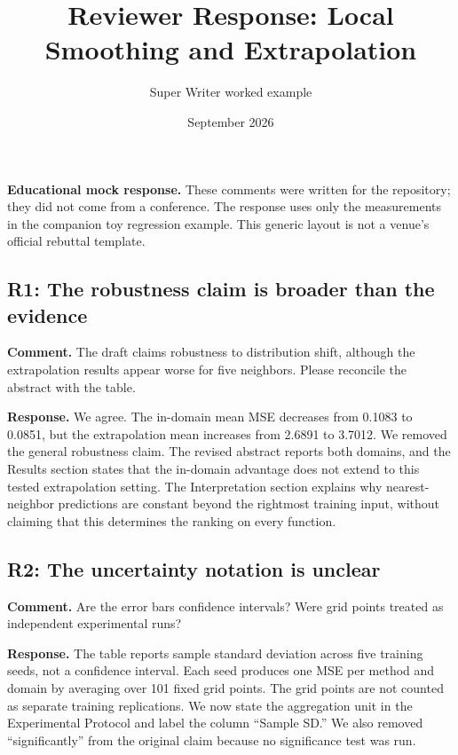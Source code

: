 \documentclass[
  10pt,
  letterpaper,
]{article}
\title{Reviewer Response: Local Smoothing and Extrapolation}
\author{Super Writer worked example}
\date{September 2026}
\begin{document}
\maketitle

\textbf{Educational mock response.} These comments were written for the
repository; they did not come from a conference. The response uses only
the measurements in the companion toy regression example. This generic
layout is not a venue's official rebuttal template.

\subsection{R1: The robustness claim is broader than the
evidence}\label{r1-the-robustness-claim-is-broader-than-the-evidence}

\textbf{Comment.} The draft claims robustness to distribution shift,
although the extrapolation results appear worse for five neighbors.
Please reconcile the abstract with the table.

\textbf{Response.} We agree. The in-domain mean MSE decreases from
0.1083 to 0.0851, but the extrapolation mean increases from 2.6891 to
3.7012. We removed the general robustness claim. The revised abstract
reports both domains, and the Results section states that the in-domain
advantage does not extend to this tested extrapolation setting. The
Interpretation section explains why nearest-neighbor predictions are
constant beyond the rightmost training input, without claiming that this
determines the ranking on every function.

\subsection{R2: The uncertainty notation is
unclear}\label{r2-the-uncertainty-notation-is-unclear}

\textbf{Comment.} Are the error bars confidence intervals? Were grid
points treated as independent experimental runs?

\textbf{Response.} The table reports sample standard deviation across
five training seeds, not a confidence interval. Each seed produces one
MSE per method and domain by averaging over 101 fixed grid points. The
grid points are not counted as separate training replications. We now
state the aggregation unit in the Experimental Protocol and label the
column ``Sample SD.'' We also removed ``significantly'' from the
original claim because no significance test was run.
\end{document}
